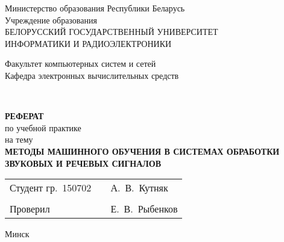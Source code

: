 \begin{titlepage}
    \begin{center}
      Министерство образования Республики Беларусь\\[1em]
      Учреждение образования\\
      БЕЛОРУССКИЙ ГОСУДАРСТВЕННЫЙ УНИВЕРСИТЕТ\\
      ИНФОРМАТИКИ И РАДИОЭЛЕКТРОНИКИ\\[2em]
  
      \begin{minipage}{\textwidth}
        \begin{flushleft}
          Факультет компьютерных систем и сетей\\[1em]
          Кафедра электронных вычислительных средств\\[1em]
        \end{flushleft}
      \end{minipage}\\[1em]
      
      \vfill

      \textbf{РЕФЕРАТ}\\
      {по учебной практике}\\
      {на тему}\\[1em]
      \MakeUppercase{\textbf{Методы машинного обучения в системах обработки звуковых и речевых сигналов}}\\[1em]

      \vfill

      \begin{tabular}{p{}p{}p{}}
        Студент гр.~150702     &&   А.~В.~Кутняк     \\
                               &&                    \\
        Проверил               &&   Е.~В.~Рыбенков   \\
      \end{tabular}
      
      \vfill

      {\normalsize Минск \the\year}
    \end{center}
\end{titlepage}